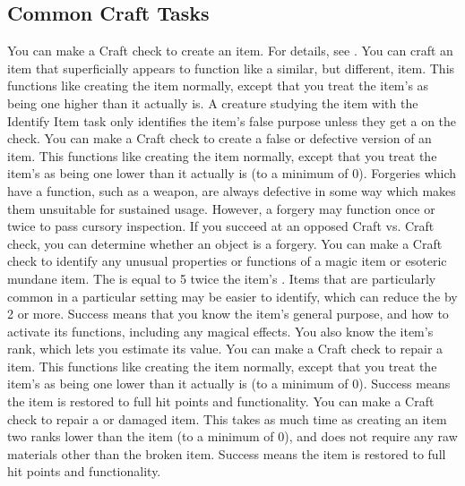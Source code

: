   \subsection{Common Craft Tasks}\label{Common Craft Tasks}
     You can make a Craft check to create an item.
    For details, see .
     You can craft an item that superficially appears to function like a similar, but different, item.
    This functions like creating the item normally, except that you treat the item's  as being one higher than it actually is.
    A creature studying the item with the Identify Item task only identifies the item's false purpose unless they get a  on the check.
     You can make a Craft check to create a false or defective version of an item.
    This functions like creating the item normally, except that you treat the item's  as being one lower than it actually is (to a minimum of 0).
    Forgeries which have a function, such as a weapon, are always defective in some way which makes them unsuitable for sustained usage.
    However, a forgery may function once or twice to pass cursory inspection.
     If you succeed at an opposed Craft vs. Craft check, you can determine whether an object is a forgery.
     You can make a Craft check to identify any unusual properties or functions of a magic item or esoteric mundane item.
    The  is equal to 5 \add twice the item's .
    Items that are particularly common in a particular setting may be easier to identify, which can reduce the  by 2 or more.
    Success means that you know the item's general purpose, and how to activate its functions, including any magical effects.
    You also know the item's rank, which lets you estimate its value.
     You can make a Craft check to repair a  item. This functions like creating the item normally, except that you treat the item's  as being one lower than it actually is (to a minimum of 0).
    Success means the item is restored to full hit points and functionality.
     You can make a Craft check to repair a  or damaged item. This takes as much time as creating an item two ranks lower than the item (to a minimum of 0), and does not require any raw materials other than the broken item.
    Success means the item is restored to full hit points and functionality.

